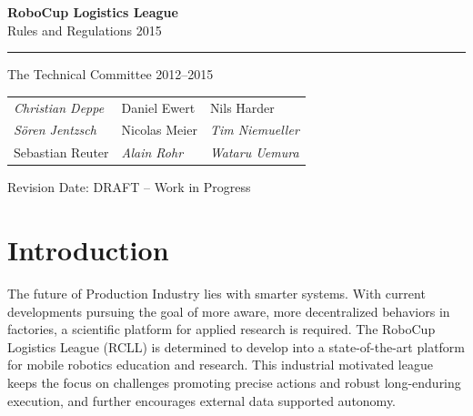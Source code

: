 \documentclass[12pt,twoside]{article}
\begin{document}
\hypersetup{pageanchor=false}


\begin{titlepage}
  \vspace*{5cm}
  \begin{center}
    \begin{LARGE}
      
      {\bf RoboCup Logistics League}\\[2ex]
      {\Large Rules and Regulations 2015}\\[4ex]
    \end{LARGE}
    \hrule
    
    {\LARGE\vspace*{4ex}}
    \begin{Large}
      The Technical Committee 2012--2015\\[6ex]
    \end{Large}
    \begin{tabular}{lll}
    \emph{Christian Deppe}&Daniel Ewert&Nils Harder\\
    \emph{S\"oren Jentzsch}&Nicolas Meier&\emph{Tim Niemueller}\\
      Sebastian Reuter&\emph{Alain Rohr}&\emph{Wataru Uemura}\\
    \end{tabular}
    \vfill
    Revision Date: DRAFT -- Work in Progress %
  \end{center}
\end{titlepage}
\thispagestyle{empty}
\pagebreak
\clearpage

\hypersetup{pageanchor=true}
\setcounter{page}{1}
\tableofcontents
\newpage
\cleardoublepage

\setcounter{page}{1}

\section{Introduction}
\label{sec:intro}
The future of Production Industry lies with smarter systems.  With
current developments pursuing the goal of more aware, more
decentralized behaviors in factories, a scientific platform for
applied research is required.  The RoboCup Logistics League (RCLL) is
determined to develop into a state-of-the-art platform for mobile
robotics education and research. This industrial motivated league
keeps the focus on challenges promoting precise actions and robust
long-enduring execution, and further encourages external data
supported autonomy.
\end{document}
